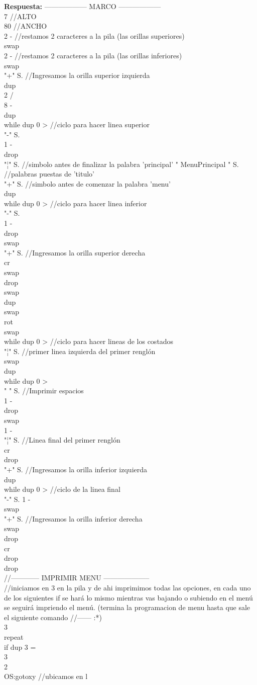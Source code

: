 \documentclass[conference]{IEEEtran}
\begin{document}
\begin{enumerate}
\begin{center}
	\textbf{Respuesta: }  ------------------ MARCO ------------------ \\ 7        	//ALTO \\ 80       	//ANCHO \\ 2 - //restamos 2 caracteres a la pila (las orillas superiores) \\ swap \\ 2 - //restamos 2 caracteres a la pila (las orillas inferiores) \\ swap \\ "+" S. //Ingresamos la orilla superior izquierda \\ dup \\ 2 / \\ 8 - \\ dup \\ while dup 0 > //ciclo para hacer linea superior \\  "-" S. \\  1 - \\ drop \\ "¦" S. //simbolo antes de finalizar la palabra 'principal' " MenuPrincipal " S. //palabras puestas de 'titulo' \\ "+" S. //simbolo antes de comenzar la palabra 'menu' \\ dup \\ while dup 0 > //ciclo para hacer linea inferior \\  "-" S. \\  1 - \\ drop \\ swap \\ "+" S. //Ingresamos la orilla superior derecha \\ cr \\ swap \\ drop \\ swap \\ dup \\ swap \\ rot \\ swap \\ while dup 0 > //ciclo para hacer lineas de los costados \\   "¦" S. //primer linea izquierda del primer renglón \\   swap \\   dup \\   while dup 0 > \\   " " S. //Imprimir espacios \\   1 - \\   drop \\   swap \\   1 - \\   "¦" S. //Linea final del primer renglón \\   cr \\ drop \\ "+" S. //Ingresamos la orilla inferior izquierda \\ dup \\ while dup 0 > //ciclo de la linea final \\  "-" S. 1 - \\ swap \\ "+" S. //Ingresamos la orilla inferior derecha \\ swap \\ drop \\ cr \\ drop \\ drop \\ //------------ IMPRIMIR MENU -------------------- \\  //iniciamos en 3 en la pila y de ahi imprimimos todas las opciones, en cada uno de los siguientes if se hará lo mismo mientras vas bajando o subiendo en el menú se seguirá impriendo el menú. (termina la programacion de menu hasta que sale el siguiente comando //------ :*) \\ 3  \\ repeat  \\ if dup 3 = \\ 3 \\ 2 \\ OS:gotoxy //ubicamos en l
\end{center}
\end{enumerate}
\end{document}
